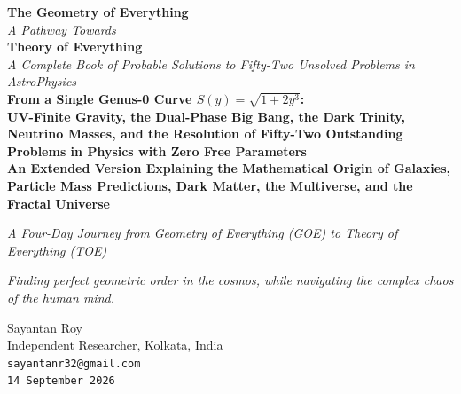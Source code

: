 \documentclass[a4paper,1pt,oneside,openany]{book}
\begin{document}
\begin{titlepage}
    \centering
    
    \vspace*{1cm} %
    
      {\Huge\bfseries The Geometry of Everything}\\[0.35cm]
    {\Large\itshape A Pathway Towards}\\[0.15cm]
    {\Huge\bfseries Theory of Everything}\\[0.9cm]
    {\LARGE \textit{A Complete Book of Probable Solutions to Fifty-Two Unsolved Problems in AstroPhysics}}\\[1.5cm]
    
    {\Large \textbf{From a Single Genus-0 Curve \(S(y) = \sqrt{1+2y^3}\):}}\\[0.5cm]
{\large\textbf{UV-Finite Gravity, the Dual-Phase Big Bang, the Dark Trinity,
Neutrino Masses, and the Resolution of Fifty-Two Outstanding Problems
in Physics with Zero Free Parameters}}\\[0.35cm]
{\large\textbf{An Extended Version Explaining the Mathematical Origin of
Galaxies, Particle Mass Predictions, Dark Matter, the Multiverse,
and the Fractal Universe}}
   
    {\small \textit{A Four-Day Journey from Geometry of Everything (GOE) to Theory of Everything (TOE)}}\\[1.5cm] 
    \begin{center}
       
        \textit{\large Finding perfect geometric order in the cosmos, while navigating the complex chaos of the human mind.}
    \end{center}
    
    \vspace{1cm}
    
    {\LARGE Sayantan Roy}\\[0.4cm]
    {\large Independent Researcher, Kolkata, India}\\[0.2cm]
    {\large \texttt{sayantanr32@gmail.com}}\\[0.2cm]
    {\large\texttt{14 September 2026}}
    
    \vfill %
    
\end{titlepage}
\end{document}
